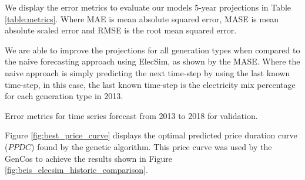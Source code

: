 








We display the error metrics to evaluate our models 5-year projections in Table \ref{table:metrics}. Where MAE is mean absolute squared error, MASE is mean absolute scaled error and RMSE is the root mean squared error.

We are able to improve the projections for all generation types when compared to the naive forecasting approach using ElecSim, as shown by the MASE. Where the naive approach is simply predicting the next time-step by using the last known time-step, in this case, the last known time-step is the electricity mix percentage for each generation type in 2013. 

\begin{table}[htb]
	\centering
	\caption{Error metrics for time series forecast from 2013 to 2018 for validation.}
	\label{table:metrics}
\end{table}

Figure \ref{fig:best_price_curve} displays the optimal predicted price duration curve ($PPDC$) found by the genetic algorithm. This price curve was used by the GenCos to achieve the results shown in Figure \ref{fig:beis_elecsim_historic_comparison}. 


